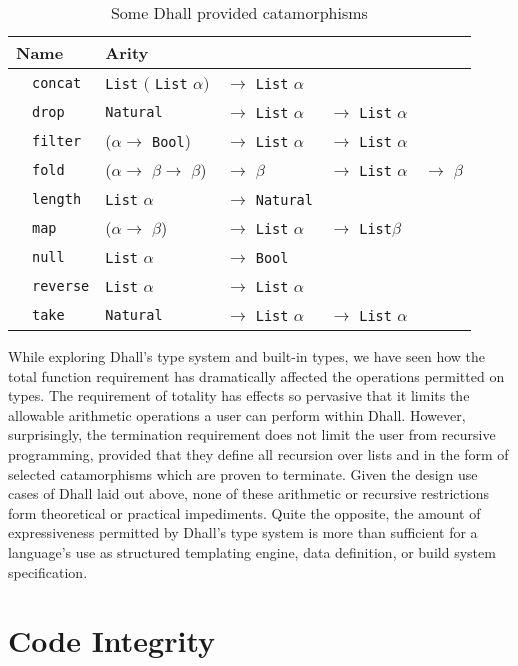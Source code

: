 \documentclass[12pt]{diazessay}
\newcommand{\F}[1]{$\quad$\texttt{#1}}
\newcommand{\A}{$\alpha$}
\newcommand{\B}{$\beta$}
\newcommand{\Bool   }{\texttt{Bool}}
\newcommand{\Nat    }{\texttt{Natural}}
\newcommand{\List   }{\texttt{List}}
\begin{document}
\begin{table}[h]
	\centering
		\begin{tabular}{ |l|llll| } 
			\hline
			Name & \multicolumn{4}{l}{Arity} \vline \\
			\hline
			\F{concat} & \List{} $($ \List{} \A $)$ &$\rightarrow$ \List{} \A & & \\
			\F{drop} &  \Nat{} & $\rightarrow$ \List{} \A &$\rightarrow$ \List{} \A & \\
			\F{filter} & (\A $\rightarrow$ \Bool{}) & $\rightarrow$ \List{} \A &$\rightarrow$ \List{} \A & \\
			\F{fold} & (\A $\rightarrow$ \B $\rightarrow$ \B) &$\rightarrow$ \B  & $\rightarrow$ \List{} \A & $\rightarrow$ \B \\
			\F{length} & \List{} \A & $\rightarrow$ \Nat & & \\
			\F{map} & (\A $\rightarrow$ \B) & $\rightarrow$ \List{} \A & $\rightarrow$ \List \B & \\
			\F{null} & \List{} \A & $\rightarrow$ \Bool & & \\
			\F{reverse} & \List{} \A & $\rightarrow$ \List{} \A & & \\
			\F{take} &  \Nat{} & $\rightarrow$ \List{} \A &$\rightarrow$ \List{} \A & \\
			\hline
		\end{tabular}
	\caption{Some Dhall provided catamorphisms}
	\label{tab:catamorphisms}
\end{table}

While exploring Dhall's type system and built-in types, we have seen how the total function requirement has dramatically affected the operations permitted on types.
The requirement of totality has effects so pervasive that it limits the allowable arithmetic operations a user can perform within Dhall.
However, surprisingly, the termination requirement does not limit the user from recursive programming, provided that they define all recursion over lists and in the form of selected catamorphisms which are proven to terminate.
Given the design use cases of Dhall laid out above, none of these arithmetic or recursive restrictions form theoretical or practical impediments.
Quite the opposite, the amount of expressiveness permitted by Dhall's type system is more than sufficient for a language's use as structured templating engine, data definition, or build system specification.

\section*{Code Integrity}
\end{document}
